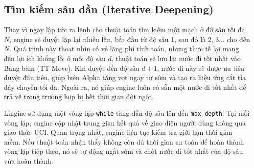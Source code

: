 \subsection{Tìm kiếm sâu dần (Iterative Deepening)}

Thay vì ngay lập tức ra lệnh cho thuật toán tìm kiếm một mạch ở độ sâu tối đa $N$, engine sẽ duyệt lặp lại nhiều lần, bắt đầu từ độ sâu 1, sau đó là 2, 3... cho đến $N$. Quá trình này thoạt nhìn có vẻ lãng phí tính toán, nhưng thực tế lại mang đến lợi ích khổng lồ: ở mỗi độ sâu $d$, thuật toán sẽ lưu lại nước đi tốt nhất vào Bảng băm (TT Move). Khi duyệt đến độ sâu $d+1$, nước đi này sẽ được ưu tiên duyệt đầu tiên, giúp biên Alpha tăng vọt ngay từ sớm và tạo ra hiệu ứng cắt tỉa dây chuyền tối đa. Ngoài ra, nó giúp engine luôn có sẵn một nước đi tốt nhất để trả về trong trường hợp bị hết thời gian đột ngột.

Lingine sử dụng một vòng lặp \texttt{while} tăng dần độ sâu lên đến \texttt{max\_depth}. Tại mỗi vòng lặp, engine cập nhật trung gian kết quả về giao diện người dùng thông qua giao thức UCI. Quan trọng nhất, engine liên tục kiểm tra giới hạn thời gian mềm. Nếu thuật toán nhận thấy không còn đủ thời gian an toàn để hoàn thành vòng lặp tiếp theo, nó sẽ tự động ngắt sớm và chốt nước đi tốt nhất của độ sâu vừa hoàn thành.

